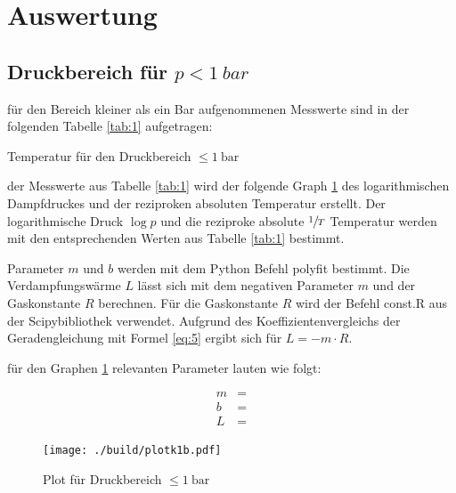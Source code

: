 \section{Auswertung}

\subsection{Druckbereich für $p < \SI{1}{bar}$}

\justifying für den Bereich kleiner als ein Bar aufgenommenen Messwerte sind in der folgenden Tabelle \ref{tab:1} aufgetragen:

\begin{table}
    \centering
    
    \caption{Temperatur für den Druckbereich $\leq \SI{1}{\bar}$}
    \label{tab:1}
\end{table}

\justifying der Messwerte aus Tabelle \ref{tab:1} wird der folgende Graph \ref{fig:4} des logarithmischen Dampfdruckes und
der reziproken absoluten Temperatur erstellt. Der logarithmische Druck $\log{p}$ und die reziproke absolute $\sfrac{1}{T}$ 
Temperatur werden mit den entsprechenden Werten aus Tabelle \ref{tab:1} bestimmt.
\newpage

\justifying Parameter $m$ und $b$ werden mit dem Python Befehl polyfit \cite{uncertainties} bestimmt. Die Verdampfungswärme $L$ lässt sich mit dem 
negativen Parameter $m$ und der Gaskonstante $R$ berechnen. Für die Gaskonstante $R$ wird der Befehl const.R aus der Scipybibliothek \cite{scipy} verwendet.
Aufgrund des Koeffizientenvergleichs der Geradengleichung mit Formel \eqref{eq:5} ergibt sich für $L = -m \cdot R$.

\justifying für den Graphen \ref{fig:4} relevanten Parameter lauten wie folgt:

\begin{subequations} \label{eq:7}
\begin{align}
    m &= \text{} \label{eq:7a}\\
    b &= \text{} \label{eq:7b}\\
    L &= \text{} \label{eq:7c}
\end{align}
\end{subequations}

\begin{figure}[H]
    \centering
    \texttt{[image: ./build/plotk1b.pdf]}
    \caption{Plot für Druckbereich $\leq \SI{1}{\bar}$}
    \label{fig:4}
\end{figure}
\newpage

